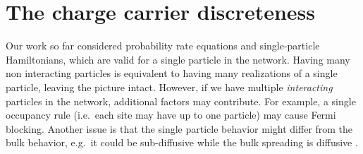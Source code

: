 
\section{The charge carrier discreteness}\label{sec:discreteness}

Our work so far considered probability rate equations and single-particle Hamiltonians, which are valid 
for a single particle in the network.
Having many non interacting particles is equivalent to having many 
realizations of a single particle, leaving the picture intact. 
However, if we have multiple \emph{interacting} particles in the network, 
additional factors may contribute. For example, a single occupancy rule 
(i.e.\ each site may have up to one particle) may cause Fermi blocking. 
Another issue is that the single particle behavior might differ from
the bulk behavior, e.g.\ it could be sub-diffusive 
while the bulk spreading is diffusive \cite{richards_theory_1977,hung_diffusion_2012}.




